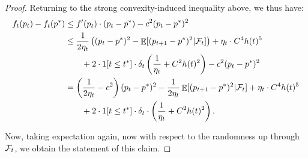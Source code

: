 \begin{proof}
    Returning to the strong convexity-induced inequality above, we thus have:
    \begin{align*}
        f_t(p_t) - f_t(p^*) &\leq f'(p_t) \cdot (p_t - p^*) - c^2 (p_t-p^*)^2\\
        &\leq \frac{1}{2\eta_t} \left((p_t-p^*)^2 - \mathop{\mathbb{E}}[(p_{t+1} - p^*)^2 | \mathcal{F}_t]\right) + \eta_t \cdot C^4 h(t)^5  \\
        &\qquad + 2 \cdot 1[t \leq t^*] \cdot \delta_t \left(\frac{1}{\eta_t} + C^2 h(t)^2\right) - c^2 (p_t-p^*)^2\\
        &= \left(\frac{1}{2\eta_t} - c^2\right) (p_t - p^*)^2 - \frac{1}{2 \eta_t} \mathop{\mathbb{E}}[(p_{t+1}-p^*)^2 | \mathcal{F}_t] + \eta_t \cdot C^4 h(t)^5  \\
        &\qquad+ 2 \cdot 1[t \leq t^*] \cdot \delta_t \cdot \left(\frac{1}{\eta_t} + C^2 h(t)^2\right).
    \end{align*}

    Now, taking expectation again, now with respect to the randomness up through $\mathcal{F}_t$, we obtain the statement of this claim.
\end{proof}

